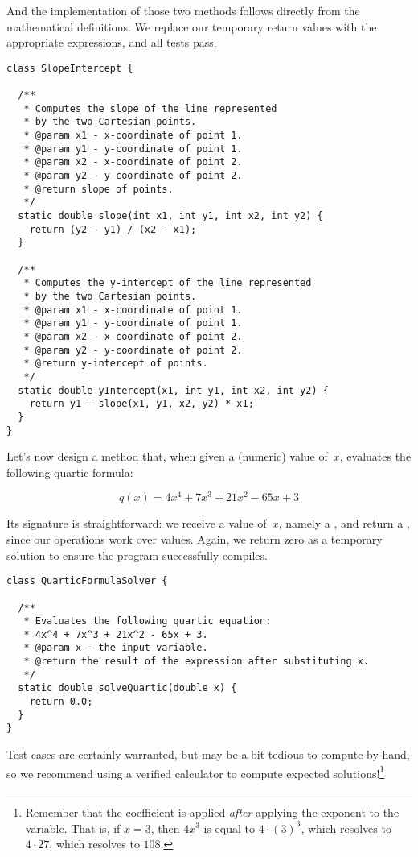 And the implementation of those two methods follows directly from the mathematical definitions. 
We replace our temporary  return values with the appropriate expressions, and all tests pass.

\begin{lstlisting}[language=MyJava]
class SlopeIntercept {

  /**
   * Computes the slope of the line represented 
   * by the two Cartesian points.
   * @param x1 - x-coordinate of point 1.
   * @param y1 - y-coordinate of point 1.
   * @param x2 - x-coordinate of point 2.
   * @param y2 - y-coordinate of point 2.
   * @return slope of points.
   */
  static double slope(int x1, int y1, int x2, int y2) {
    return (y2 - y1) / (x2 - x1);
  }

  /**
   * Computes the y-intercept of the line represented 
   * by the two Cartesian points.
   * @param x1 - x-coordinate of point 1.
   * @param y1 - y-coordinate of point 1.
   * @param x2 - x-coordinate of point 2.
   * @param y2 - y-coordinate of point 2.
   * @return y-intercept of points.
   */
  static double yIntercept(x1, int y1, int x2, int y2) {
    return y1 - slope(x1, y1, x2, y2) * x1;
  }
}
\end{lstlisting}

Let's now design a method that, when given a (numeric) value of~$x$, evaluates the following quartic formula:

\[
q(x) = 4x^4 + 7x^3 + 21x^2 - 65x + 3
\]

Its signature is straightforward: we receive a value of~$x$, namely a , and return a , since our operations work over  values. 
Again, we return zero as a temporary solution to ensure the program successfully compiles.

\begin{lstlisting}[language=MyJava]
class QuarticFormulaSolver {

  /**
   * Evaluates the following quartic equation:
   * 4x^4 + 7x^3 + 21x^2 - 65x + 3.
   * @param x - the input variable.
   * @return the result of the expression after substituting x.
   */
  static double solveQuartic(double x) {
    return 0.0;
  }
}
\end{lstlisting}

Test cases are certainly warranted, but may be a bit tedious to compute by hand, so we recommend using a verified calculator to compute expected solutions!\footnote{Remember that the coefficient is applied \emph{after} applying the exponent to the variable. That is, if $x=3$, then $4x^3$ is equal to $4 \cdot (3)^3$, which resolves to $4 \cdot 27$, which resolves to $108$.}

